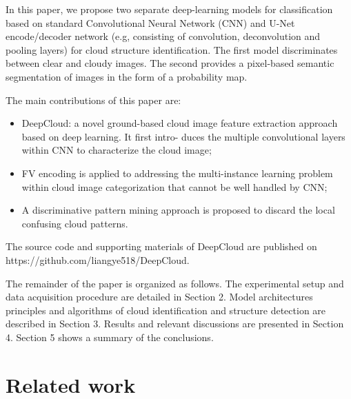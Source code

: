 \documentclass{article}
\begin{document}
In this paper, we propose two separate deep-learning models for classification based on standard Convolutional Neural Network (CNN) and U-Net encode/decoder network (e.g, consisting of convolution, deconvolution and pooling layers) for cloud structure identification. The first model discriminates between clear and cloudy images. The second provides a pixel-based semantic segmentation of images in the form of a probability map.

The main contributions of this paper are:
\begin{itemize}
    \item DeepCloud: a novel ground-based cloud image feature
    extraction approach based on deep learning. It first intro-
    duces the multiple convolutional layers within CNN to
    characterize the cloud image;
    \item FV encoding is applied to addressing the multi-instance
    learning problem within cloud image categorization that
    cannot be well handled by CNN;
    \item  A discriminative pattern mining  approach is proposed to
    discard the local confusing cloud patterns.
\end{itemize}

The source code and supporting materials of DeepCloud are
published on https://github.com/liangye518/DeepCloud.

The remainder of the paper is organized as follows. The experimental setup and data acquisition procedure are detailed in Section 2. Model architectures principles and algorithms of cloud identification and structure detection are described in Section 3. Results and relevant discussions are presented in Section 4. Section 5 shows a summary of the conclusions.

\section{Related work}
\end{document}
